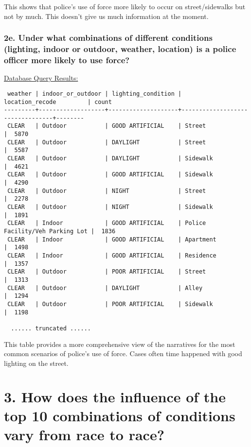 \documentclass[10pt]{article}
\begin{document}
This shows that police's use of force more likely to occur on street/sidewalks but not by much. This doesn't give us much information at the moment.

\subsubsection*{2e. Under what combinations of different conditions (lighting, indoor or outdoor, weather, location) is a police officer more likely to use force?}

\underline{Database Query Results:}

\begin{verbatim}
 weather | indoor_or_outdoor | lighting_condition |         location_recode         | count
---------+-------------------+--------------------+---------------------------------+--------
 CLEAR   | Outdoor           | GOOD ARTIFICIAL    | Street                          |  5870
 CLEAR   | Outdoor           | DAYLIGHT           | Street                          |  5587
 CLEAR   | Outdoor           | DAYLIGHT           | Sidewalk                        |  4621
 CLEAR   | Outdoor           | GOOD ARTIFICIAL    | Sidewalk                        |  4290
 CLEAR   | Outdoor           | NIGHT              | Street                          |  2278
 CLEAR   | Outdoor           | NIGHT              | Sidewalk                        |  1891
 CLEAR   | Indoor            | GOOD ARTIFICIAL    | Police Facility/Veh Parking Lot |  1836
 CLEAR   | Indoor            | GOOD ARTIFICIAL    | Apartment                       |  1498
 CLEAR   | Indoor            | GOOD ARTIFICIAL    | Residence                       |  1357
 CLEAR   | Outdoor           | POOR ARTIFICIAL    | Street                          |  1313
 CLEAR   | Outdoor           | DAYLIGHT           | Alley                           |  1294
 CLEAR   | Outdoor           | POOR ARTIFICIAL    | Sidewalk                        |  1198

  ...... truncated ......
\end{verbatim}

This table provides a more comprehensive view of the narratives for the most common scenarios of police's use of force. Cases often time happened with good lighting on the street.


\section*{3. How does the influence of the top 10 combinations of conditions vary from race to race?}
\end{document}
